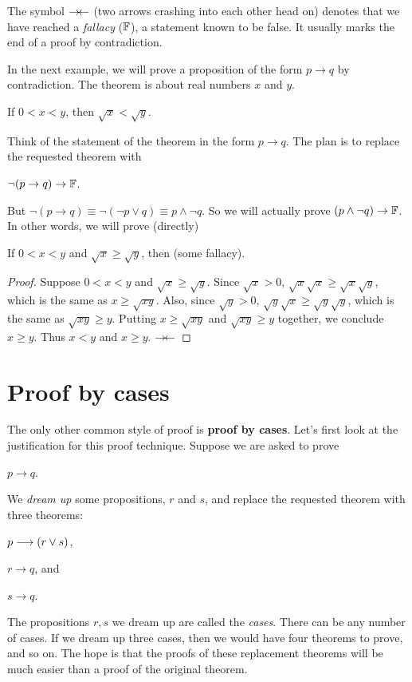 The symbol $\rightarrow \!\leftarrow$ (two arrows crashing into each other head on) 
denotes that we have reached a \emph{fallacy} ($\mathbb{F}$), a statement 
known to be false. It usually marks the end of a proof by contradiction.

In the next example, we will prove a proposition of the form $p\to q$ by
contradiction. The theorem is about real numbers $x$ and $y$.
\begin{thm}
 If $0<x<y$, then $\sqrt{x}<\sqrt{y}$.
\end{thm}
\noindent Think of the statement of the theorem  in the form  $p\to q$. The plan is to replace the
 requested theorem with
\begin{thm}
 $\neg(p\to q)\to \mathbb{F}$.
\end{thm}
\noindent But $\neg(p\to q)\equiv \neg(\neg p\lor q)
\equiv p\land \neg q$. So we will actually prove $(p\land \neg q)\to \mathbb{F}$.
In other words, we will prove (directly)
\begin{thm}
 If  $0<x<y$ and  $\sqrt{x}\geq\sqrt{y}$, then (some fallacy).
\end{thm}
\begin{proof}
 Suppose  $0<x<y$ and  $\sqrt{x}\geq\sqrt{y}$. Since
 $\sqrt{x}>0$, $\sqrt{x}\sqrt{x}\geq\sqrt{x}\sqrt{y}$, which is the same as
 $x\geq \sqrt{xy}$. Also, since $\sqrt{y}>0$, $\sqrt{y}\sqrt{x}\geq \sqrt{y}\sqrt{y}$,
 which is the same as $\sqrt{xy}\geq y$. Putting $x\geq \sqrt{xy}$ and $\sqrt{xy}\geq y$
 together,
 we conclude $x\geq y$. Thus $x<y$ and $x\geq y$. $\rightarrow \!\leftarrow$
\end{proof}

\section{Proof by cases}
The only other common style of proof is {\bfseries proof by cases}. 
Let's first look at the justification for this proof technique.
Suppose we are asked to prove

\begin{thm}[Theorem X]
$p\to q$.
\end{thm}
We {\itshape dream up} some propositions, $r$ and $s$, and replace the requested
theorem with  three theorems:

\begin{thm}[Theorem XS]
\begin{enumerate*}
\item $p\longrightarrow(r\lor s)$,
\item $r\to q$, and
\item $s\to q$.
\end{enumerate*}
\end{thm}\label{thm: cases thm XS}
The propositions $r,s$ we dream up are called the {\itshape cases}. There can
be any number of cases. If we dream up three cases, then we would have
four theorems to prove, and so on. The hope is that the proofs of these
replacement theorems will be much easier than a proof of the original theorem.

